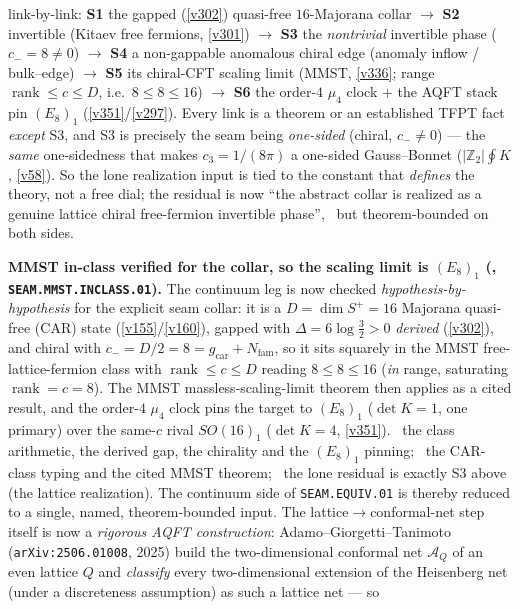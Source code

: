 \documentclass[11pt,a4paper]{article}
\newcommand{\cthree}{c_3}
\newcommand{\Nfam}{N_{\mathrm{fam}}}
\newcommand{\gcar}{g_{\mathrm{car}}}
\newcommand{\Z}{\mathbb Z}
\begin{document}
\begin{keybox}
link-by-link: \textbf{S1} the gapped (\vref{v302}) quasi-free $16$-Majorana collar $\to$ \textbf{S2} invertible
(Kitaev free fermions, \vref{v301}) $\to$ \textbf{S3} the \emph{nontrivial} invertible phase ($c_-=8\neq0$) $\to$
\textbf{S4} a non-gappable anomalous chiral edge (anomaly inflow / bulk--edge) $\to$ \textbf{S5} its chiral-CFT
scaling limit (MMST, \vref{v336}; range $\operatorname{rank}\le c\le D$, i.e.\ $8\le8\le16$) $\to$ \textbf{S6} the
order-$4$ $\mu_4$ clock $+$ the AQFT stack pin $(E_8)_1$ (\vref{v351}/\vref{v297}). Every link is a theorem or an
established TFPT fact \emph{except} S3, and S3 is precisely the seam being \emph{one-sided} (chiral, $c_-\neq0$) ---
the \emph{same} one-sidedness that makes $\cthree=1/(8\pi)$ a one-sided Gauss--Bonnet ($|\Z_2|\oint K$, \vref{v58}).
So the lone realization input is tied to the constant that \emph{defines} the theory, not a free dial; the residual
is now ``the abstract collar is realized as a genuine lattice chiral free-fermion invertible phase'', \mO\ but
theorem-bounded on both sides.
\par\smallskip\noindent\textbf{MMST in-class verified for the collar, so the scaling limit is $(E_8)_1$
(, \texttt{SEAM.MMST.INCLASS.01}).} The continuum leg is now checked
\emph{hypothesis-by-hypothesis} for the explicit seam collar: it is a $D{=}\dim S^+{=}16$ Majorana quasi-free
(CAR) state (\vref{v155}/\vref{v160}), gapped with $\Delta{=}6\log\tfrac32{>}0$ \emph{derived} (\vref{v302}), and
chiral with $c_-{=}D/2{=}8{=}\gcar{+}\Nfam$, so it sits squarely in the MMST free-lattice-fermion class with
$\operatorname{rank}\le c\le D$ reading $8\le8\le16$ (\emph{in} range, saturating $\operatorname{rank}{=}c{=}8$).
The MMST massless-scaling-limit theorem then applies as a cited result, and the order-$4$ $\mu_4$ clock pins the
target to $(E_8)_1$ ($\det K{=}1$, one primary) over the same-$c$ rival $SO(16)_1$ ($\det K{=}4$, \vref{v351}).
\mE\ the class arithmetic, the derived gap, the chirality and the $(E_8)_1$ pinning; \mC\ the CAR-class typing and
the cited MMST theorem; \mO\ the lone residual is exactly S3 above (the lattice realization). The continuum side
of \texttt{SEAM.EQUIV.01} is thereby reduced to a single, named, theorem-bounded input. The lattice$\to$conformal-net
step itself is now a \emph{rigorous AQFT construction}: Adamo--Giorgetti--Tanimoto (\texttt{arXiv:2506.01008}, 2025)
build the two-dimensional conformal net $\mathcal A_Q$ of an even lattice $Q$ and \emph{classify} every
two-dimensional extension of the Heisenberg net (under a discreteness assumption) as such a lattice net --- so

\end{keybox}
\end{document}
